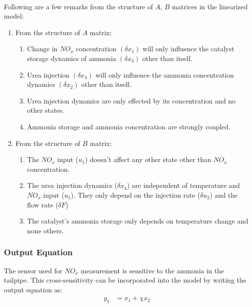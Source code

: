 \bigskip

\noindent{}\\

Following are a few remarks from the structure of $A$, $B$ matrices in the
linearized model:

\begin{enumerate}
    \item From the structure of $A$ matrix:
    \begin{enumerate}
\item Change in $NO_x$ concentration $(\delta x_1)$ will only influence the
catalyst storage dynamics of ammonia $(\delta x_3)$ other than itself.

\item Urea injection $(\delta x_4)$ will only influence the ammonia
concentration dynamics $(\delta x_2)$ other than itself.

\item Urea injection dynamics are only effected by its concentration and
no other states.

\item Ammonia storage and ammonia concentration are strongly coupled.
    \end{enumerate}
    \item From the structure of $B$ matrix:
    \begin{enumerate}
        \item The $NO_x$ input ($u_1$) doesn't affect any other state other than $NO_x$ concentration.

\item The urea injection dynamics ($\delta x_4$) are independent of temperature
and $NO_x$ input ($u_1$). They only depend on the injection rate ($\delta u_2$)
and the flow rate ($\delta F$)

\item The catalyst's ammonia storage only depends on temperature change and none others.
    \end{enumerate}
\end{enumerate}



\subsubsection{Output Equation}
The sensor used for $NO_x$ measurement is sensitive to the ammonia in the
tailpipe. This cross-sensitivity can be incorporated into the model by writing
the output equation as:
\begin{align*}
    y_1 &= x_1 + \chi x_2\\
\end{align*}


